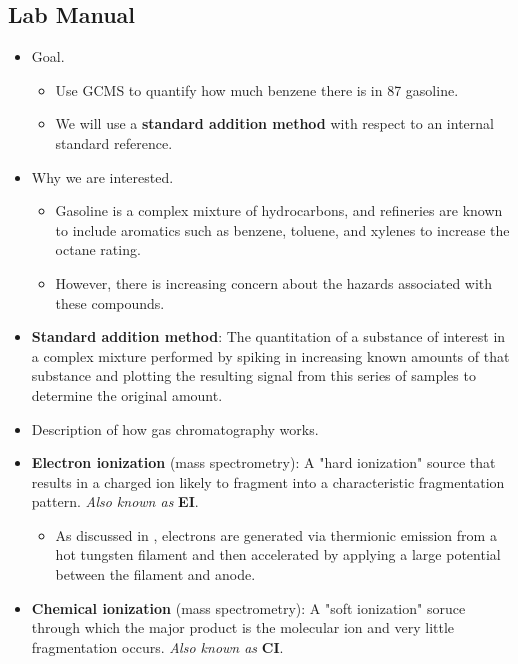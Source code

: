 \documentclass[../notes.tex]{subfiles}
\begin{document}
\subsection*{Lab Manual}
\begin{itemize}
    \item {}Goal.
    \begin{itemize}
        \item Use GCMS to quantify how much benzene there is in 87 gasoline.
        \item We will use a \textbf{standard addition method} with respect to an internal standard reference.
    \end{itemize}
    \item Why we are interested.
    \begin{itemize}
        \item Gasoline is a complex mixture of hydrocarbons, and refineries are known to include aromatics such as benzene, toluene, and xylenes to increase the octane rating.
        \item However, there is increasing concern about the hazards associated with these compounds.
    \end{itemize}
    \item \textbf{Standard addition method}: The quantitation of a substance of interest in a complex mixture performed by spiking in increasing known amounts of that substance and plotting the resulting signal from this series of samples to determine the original amount.
    \item Description of how gas chromatography works.
    \item \textbf{Electron ionization} (mass spectrometry): A "hard ionization" source that results in a charged ion likely to fragment into a characteristic fragmentation pattern. \emph{Also known as} \textbf{EI}.
    \begin{itemize}
        \item As discussed in \textcite{bib:CHEM30200Notes}, electrons are generated via thermionic emission from a hot tungsten filament and then accelerated by applying a large potential between the filament and anode.
    \end{itemize}
    \item \textbf{Chemical ionization} (mass spectrometry): A "soft ionization" soruce through which the major product is the molecular ion and very little fragmentation occurs. \emph{Also known as} \textbf{CI}.

\end{itemize}
\end{document}
